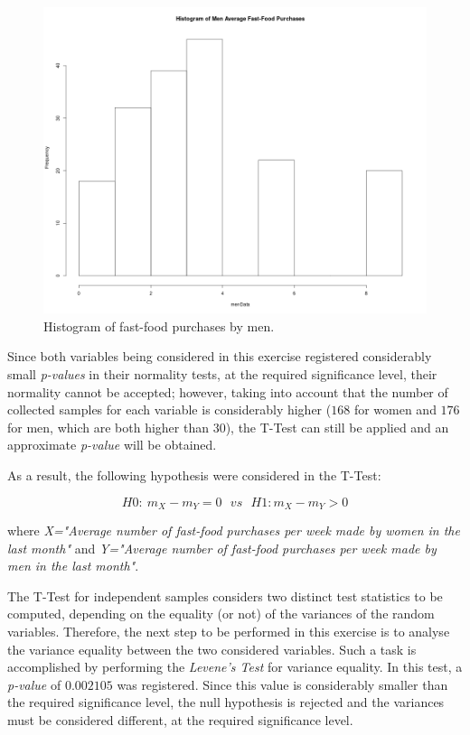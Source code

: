 \documentclass[12pt]{article}
\begin{document}
\begin{figure}[H]
	\centering
	\includegraphics[scale=0.28]{images/Histogram_MenData.png}
	\caption{Histogram of fast-food purchases by men.}
	\label{histogram_men_purchases}
\end{figure}

Since both variables being considered in this exercise registered considerably small \emph{p-values} in their normality tests, at the required significance level, their normality cannot be accepted; however, taking into account that the number of collected samples for each variable is considerably higher ($168$ for women and $176$ for men, which are both higher than $30$), the T-Test can still be applied and an approximate \emph{p-value} will be obtained.

As a result, the following hypothesis were considered in the T-Test:

$$ H0: \: m_{X} - m_{Y} = 0 \: \: \: vs \: \: \: H1: m_{X} - m_{Y} > 0$$

where \emph{X="Average number of fast-food purchases per week made by women in the last month"} and \emph{Y="Average number of fast-food purchases per week made by men in the last month"}.

The T-Test for independent samples considers two distinct test statistics to be computed, depending on the equality (or not) of the variances of the random variables. Therefore, the next step to be performed in this exercise is to analyse the variance equality between the two considered variables. Such a task is accomplished by performing the \emph{Levene's Test} for variance equality. In this test, a \emph{p-value} of $0.002105$ was registered. Since this value is considerably smaller than the required significance level, the null hypothesis is rejected and the variances must be considered different, at the required significance level.
\end{document}
